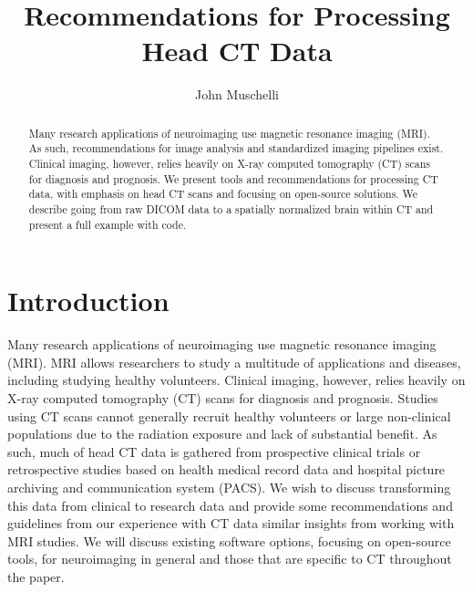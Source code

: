 \documentclass[]{elsarticle} %
\begin{document}
\begin{frontmatter}

  \title{Recommendations for Processing Head CT Data}
    \author[JHSPH]{John Muschelli}
  
      \address[JHSPH]{Johns Hopkins Bloomberg School of Public Health, Department of
Biostatistics, 615 N Wolfe St, Baltimore, MD, 21205}
    \address[JHMI]{Johns Hopkins Hospital, Department of Neurology, 601 N Caroline St,
Baltimore, MD 21205}
    \address[BIOS]{Brain Injury Outcomes, Johns Hopkins University, 750 East Pratt Street,
Baltimore, MD 21202}
  
  \begin{abstract}
  Many research applications of neuroimaging use magnetic resonance
  imaging (MRI). As such, recommendations for image analysis and
  standardized imaging pipelines exist. Clinical imaging, however, relies
  heavily on X-ray computed tomography (CT) scans for diagnosis and
  prognosis. We present tools and recommendations for processing CT data,
  with emphasis on head CT scans and focusing on open-source solutions. We
  describe going from raw DICOM data to a spatially normalized brain
  within CT and present a full example with code.
  \end{abstract}
  
 \end{frontmatter}

\hypertarget{introduction}{%
\section{Introduction}\label{introduction}}

Many research applications of neuroimaging use magnetic resonance
imaging (MRI). MRI allows researchers to study a multitude of
applications and diseases, including studying healthy volunteers.
Clinical imaging, however, relies heavily on X-ray computed tomography
(CT) scans for diagnosis and prognosis. Studies using CT scans cannot
generally recruit healthy volunteers or large non-clinical populations
due to the radiation exposure and lack of substantial benefit. As such,
much of head CT data is gathered from prospective clinical trials or
retrospective studies based on health medical record data and hospital
picture archiving and communication system (PACS). We wish to discuss
transforming this data from clinical to research data and provide some
recommendations and guidelines from our experience with CT data similar
insights from working with MRI studies. We will discuss existing
software options, focusing on open-source tools, for neuroimaging in
general and those that are specific to CT throughout the paper.
\end{document}
